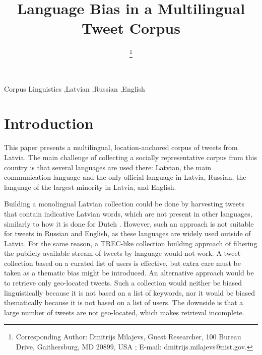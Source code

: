 \documentclass{IOS-Book-Article}
\begin{document}
\begin{frontmatter}              %

\title{Language Bias in a Multilingual Tweet Corpus}

\author[A]{ %
  \thanks{Corresponding Author: Dmitrijs Milajevs, Guest Researcher,
    100 Bureau Drive,
    Gaithersburg, MD 20899, USA%
    ;
    E-mail: dmitrijs.milajevs@nist.gov.}}


\address[A]{Guest Researcher at National Institute of Standards and Technology, Maryland, USA}

%

\begin{keyword}
Corpus Linguistics \sep Latvian \sep Russian \sep English
\end{keyword}
\end{frontmatter}

\thispagestyle{empty}
\pagestyle{empty}

\section*{Introduction}

This paper presents a multilingual, location-anchored corpus of tweets from Latvia. The main challenge of collecting a socially representative corpus from this country is that several languages are used there: Latvian, the main communication language and the only official language in Latvia, Russian, the language of the largest minority in Latvia, and English.

%
Building a monolingual Latvian collection could be done by harvesting tweets that contain indicative Latvian words, which are not present in other languages, similarly to how it is done for Dutch \cite{sang2013}. However, such an approach is not suitable for tweets in Russian and English, as these languages are widely used outside of Latvia.
%
For the same reason, a TREC-like collection building approach \cite{lin2016overview} of filtering the publicly available stream of tweets by language would not work.
%
A tweet collection based on a curated list of users \cite{SANVICENTE16.465} is effective, but extra care must be taken as a thematic bias might be introduced.
%
An alternative approach would be to retrieve only geo-located tweets. Such a collection would neither be biased linguistically because it is not based on a list of keywords, nor it would be biased thematically because it is not based on a list of users. The downside is that a large number of tweets are not geo-located, which makes retrieval incomplete.
\end{document}
